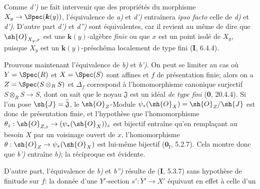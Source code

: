 Comme \emph{d')} ne fait intervenir que des propriétés du morphisme $X_y\to\Spec(\boldsymbol{k}(y))$, l'équivalence de \emph{a)} et \emph{d')} entraînera \emph{ipso facto} celle de \emph{d)} et \emph{d')}. D'autre part \emph{d')} et \emph{d'')} sont équivalentes, car il revient au même de dire que $\sh{O}_{X_y,x}$ est une $\boldsymbol{k}(y)$-algèbre \emph{finie} ou que $x$ est un point isolé de $X_y$, puisque $X_y$ est un $\boldsymbol{k}(y)$-préschéma localement de type fini (\textbf{I}, 6.4.4).

Prouvons maintenant l'équivalence de \emph{b)} et \emph{b')}. On peut se limiter au cas où $Y=\Spec(R)$ et $X=\Spec(S)$ sont affines et $f$ de présentation finie; alors on a $Z=\Spec(S\otimes_R S)$ et $\Delta_f$ correspond à l'homomorphisme canonique surjectif $S\otimes_R S\to S$, dont on sait que le noyau $\mathfrak{J}$ est un idéal \emph{de type fini} (\textbf{0}, 20.4.4). Si l'on pose $\sh{J}=\widetilde{\mathfrak{J}}$, le $\sh{O}_Z$-Module $\psi_*(\sh{O}_X)=\sh{O}_Z/\sh{J}$ est donc de présentation finie, et l'hypothèse que l'homomorphisme $\theta_z: \sh{O}_{Z,z}\to(\psi_*(\sh{O}_X))_z$ est bijectif entraîne qu'en remplaçant au besoin $X$ par un voisinage ouvert de $x$, l'homomorphisme $\theta:\sh{O}_Z\to\psi_*(\sh{O}_X)$ est lui-même bijectif ($\mathbf{0}_{\mathrm I}$, 5.2.7). Cela montre donc que \emph{b')} entraîne \emph{b)}; la réciproque est évidente.

D'autre part, l'équivalence de \emph{b)} et \emph{b'')} résulte de (\textbf{I}, 5.3.7) sans hypothèse de finitude sur $f$: la donnée d'une $Y'$-section $s':Y'\to X'$ équivaut en effet à celle d'un

